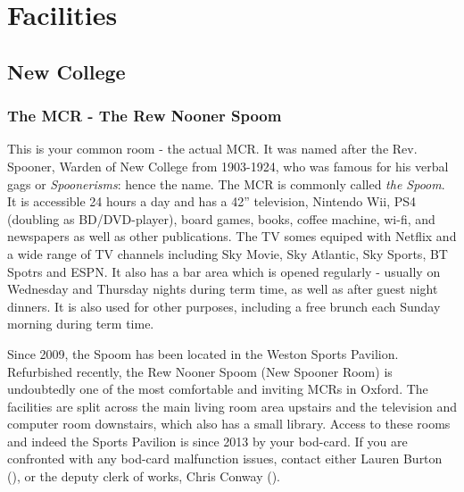 

\chapter{Facilities}
 
\section{New College}

\subsection{The MCR - The Rew Nooner Spoom}\label{ssec:Spoom}

This is your common room - the actual MCR. It was named after the Rev. Spooner, Warden of New College from 1903-1924, who was famous for his verbal gags or \emph{Spoonerisms}: hence the name. The MCR is commonly called \emph{the Spoom}. It is accessible 24 hours a day and has a 42'' television, Nintendo Wii, PS4 (doubling as BD/DVD-player), board games, books, coffee machine, wi-fi, and newspapers as well as other publications. The TV somes equiped with Netflix and a wide range of TV channels including Sky Movie, Sky Atlantic, Sky Sports, BT Spotrs and ESPN. It also has a bar area which is opened regularly - usually on Wednesday and Thursday nights during term time, as well as after guest night dinners. It is also used for other purposes, including a free brunch each Sunday morning during term time.

Since 2009, the Spoom has been located in the Weston Sports Pavilion.
Refurbished recently, the Rew Nooner Spoom (New Spooner Room) is undoubtedly one
of the most comfortable and inviting MCRs in Oxford. The facilities are split
across the main living room area upstairs and the television and computer room
downstairs, which also has a small library.
Access to these rooms and indeed the Sports Pavilion is since 2013 by your
bod-card. If you are confronted with any bod-card malfunction issues, contact
either Lauren Burton (\href{mailto:lauren.burton@new.ox.ac.uk}{}), or the deputy clerk of works, Chris Conway (\href{mailto:chris.conway@new.ox.ac.uk}{}).

